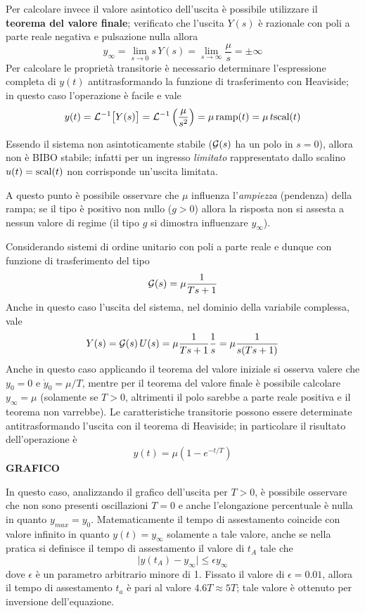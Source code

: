 		Per calcolare invece il valore asintotico dell'uscita è possibile utilizzare il \textbf{teorema del valore finale}; verificato che l'uscita $Y(s)$ è razionale con poli a parte reale negativa e pulsazione nulla allora
		\[y_\infty = \lim_{s\rightarrow 0} s \, Y(s) = \lim_{s\rightarrow \infty} \frac \mu s = \pm \infty \]
		Per calcolare le proprietà transitorie è necessario determinare l'espressione completa di $y(t)$ antitrasformando la funzione di trasferimento con Heaviside; in questo caso l'operazione è facile e vale
		\[  y(t) = \mathcal L^{-1} \big[Y(s)\big] = \mathcal L^{-1}\left(\frac \mu {s^2}\right) = \mu\,  \textrm{ramp}(t) = \mu\, t \textrm{scal} (t) \]
		\begin{nota}
			Essendo il sistema non asintoticamente stabile ($\mathcal G(s)$ ha un polo in $s=0$), allora non è BIBO stabile; infatti per un ingresso \textit{limitato} rappresentato dallo scalino $u(t) = \textrm{scal}(t)$ non corrisponde un'uscita limitata.
		\end{nota}
		A questo punto è possibile osservare che $\mu$ influenza l'\textit{ampiezza} (pendenza) della rampa; se il tipo è positivo non nullo ($g>0$) allora la risposta non si assesta a nessun valore di regime (il tipo $g$ si dimostra influenzare $y_\infty$).
		
		\vspace{3mm}
		Considerando sistemi di ordine unitario con poli a parte reale e dunque con funzione di trasferimento del tipo
		\[ \mathcal G(s)= \mu \frac 1 {Ts + 1} \]
		Anche in questo caso l'uscita del sistema, nel dominio della variabile complessa, vale
		\[ Y(s) = \mathcal G(s) \, U(s) = \mu \frac 1 {Ts + 1} \frac 1 s = \mu \frac 1 {s(Ts + 1)}\]
		Anche in questo caso applicando il teorema del valore iniziale si osserva valere che $y_0 = 0$ e $\dot y_0 = \mu / T$, mentre per il teorema del valore finale è possibile calcolare $y_\infty=\mu$ (solamente se $T>0$, altrimenti il polo sarebbe a parte reale positiva e il teorema non varrebbe). Le caratteristiche transitorie possono essere determinate antitrasformando l'uscita con il teorema di Heaviside; in particolare il risultato dell'operazione è
		\[ y(t) = \mu \left(1-e^{-t/T}\right)\]
		\textbf{GRAFICO}
		
		In questo caso, analizzando il grafico dell'uscita per $T>0$, è possibile osservare che non sono presenti oscillazioni $T=0$ e anche l'elongazione percentuale è nulla in quanto $y_{max} = y_{0}$. Matematicamente il tempo di assestamento coincide con valore infinito in quanto $y(t) = y_\infty$ solamente a tale valore, anche se nella pratica si definisce il tempo di assestamento il valore di $t_A$ tale che
		\[ \big|y(t_A) - y_\infty\big|  \leq \epsilon y_\infty\]
		dove $\epsilon$ è un parametro arbitrario minore di 1. Fissato il valore di $\epsilon=0.01$, allora il tempo di assestamento $t_a$ è pari al valore $4.6T\approx 5T$; tale valore è ottenuto per inversione dell'equazione.
		
